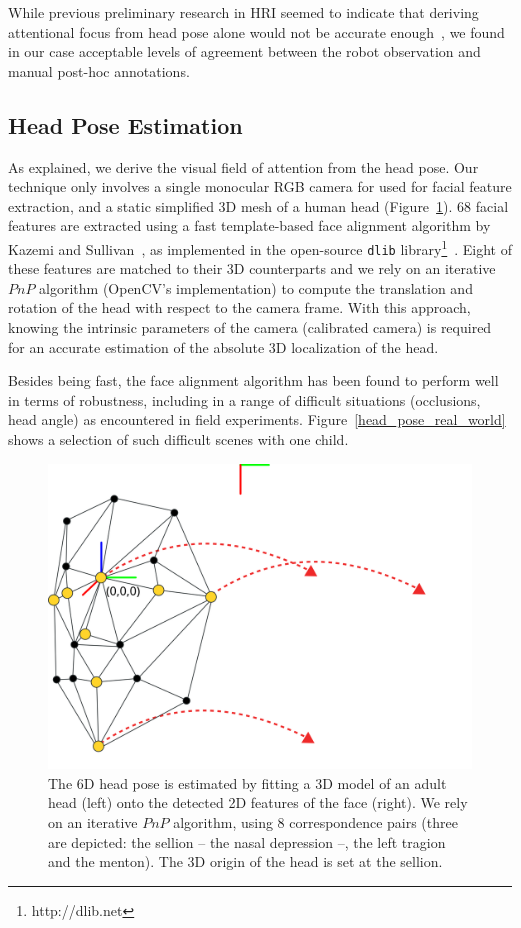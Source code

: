 \documentclass{sig-alternate}
\begin{document}
While previous preliminary research in HRI seemed to indicate that deriving
attentional focus from head pose alone would not be accurate
enough~\cite{kennedy2015head}, we found in our case acceptable levels of
agreement between the robot observation and manual post-hoc annotations.


\subsection{Head Pose Estimation}

As explained, we derive the visual field of attention from the head pose. Our
technique only involves a single monocular RGB camera for used for facial
feature extraction, and a static simplified 3D mesh of a human head
(Figure~\ref{head_pose}). 68 facial features are extracted using a fast
template-based face alignment algorithm by Kazemi and
Sullivan~\cite{kazemi2014one}, as implemented in the open-source {\tt dlib}
library\footnote{http://dlib.net}~\cite{dlib09}.  Eight of these features are
matched to their 3D counterparts and we rely on an iterative $PnP$ algorithm
(OpenCV's implementation) to compute the translation and rotation of the head
with respect to the camera frame. With this approach, knowing the intrinsic
parameters of the camera (calibrated camera) is required for an accurate
estimation of the absolute 3D localization of the head.

Besides being fast, the face alignment algorithm has been found to perform well
in terms of robustness, including in a range of difficult situations
(occlusions, head angle) as encountered in field experiments.
Figure~\ref{head_pose_real_world} shows a selection of such difficult scenes with
one child.

\begin{figure}[t]
    \centering
    \includegraphics[width=0.9\linewidth]{head_pose}
    \caption{The 6D head pose is estimated by fitting a 3D model of an
        adult head (left) onto the detected 2D features of the face (right). We
        rely on an iterative $PnP$ algorithm, using 8 correspondence pairs
        (three are depicted: the sellion -- the nasal depression --, the left
        tragion and the menton). The 3D origin of the head is set at the sellion.}

    \label{head_pose}
\end{figure}
\end{document}
